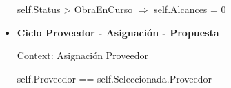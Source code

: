 \begin{itemize}
			self.Status > ObraEnCurso $\Rightarrow$ self.Alcances = 0
			
	\item \textbf{Ciclo Proveedor - Asignaci\'on - Propuesta}
	
			Context: Asignación Proveedor
			
			self.Proveedor == self.Seleccionada.Proveedor
	
	
\end{itemize}
